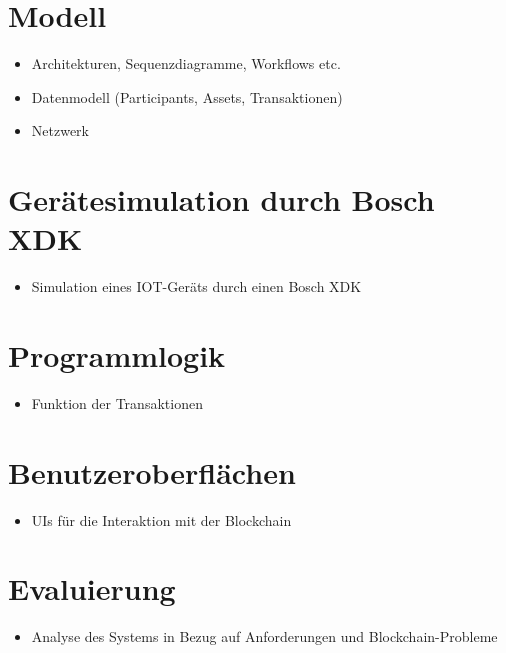 \section{Modell}
\begin{itemize}
    \item Architekturen, Sequenzdiagramme, Workflows etc.
    \item Datenmodell (Participants, Assets, Transaktionen)
    \item Netzwerk
\end{itemize}

\section{Gerätesimulation durch Bosch XDK}
\begin{itemize}
    \item Simulation eines IOT-Geräts durch einen Bosch XDK
\end{itemize}

\section{Programmlogik}
\begin{itemize}
    \item Funktion der Transaktionen
\end{itemize}

\section{Benutzeroberflächen}
\begin{itemize}
    \item UIs für die Interaktion mit der Blockchain
\end{itemize}


\section{Evaluierung}
\begin{itemize}
    \item Analyse des Systems in Bezug auf Anforderungen und Blockchain-Probleme
\end{itemize}



